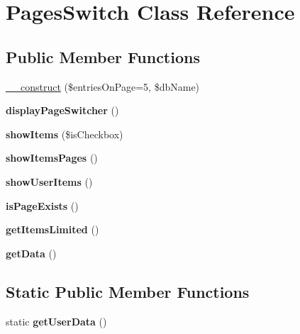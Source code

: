 \hypertarget{class_pages_switch}{}\section{Pages\+Switch Class Reference}
\label{class_pages_switch}
\subsection*{Public Member Functions}
\begin{DoxyCompactItemize}
\item 
\hyperlink{class_pages_switch_aa348d2193f6b5797af684dc8ae0e5c05}{\+\_\+\+\_\+construct} (\$entries\+On\+Page=5, \$db\+Name)
\item 
\hypertarget{class_pages_switch_ad9b788f51dc4e6326b5c82e78bed9265}{}{\bfseries display\+Page\+Switcher} ()\label{class_pages_switch_ad9b788f51dc4e6326b5c82e78bed9265}

\item 
\hypertarget{class_pages_switch_ad16bbacd730a2d8f2377120cbb9986db}{}{\bfseries show\+Items} (\$is\+Checkbox)\label{class_pages_switch_ad16bbacd730a2d8f2377120cbb9986db}

\item 
\hypertarget{class_pages_switch_a6f229ff2fb612ac2b541b97b532428d1}{}{\bfseries show\+Items\+Pages} ()\label{class_pages_switch_a6f229ff2fb612ac2b541b97b532428d1}

\item 
\hypertarget{class_pages_switch_a8bdd8e3ac71b22d622a8ec64b03f8a27}{}{\bfseries show\+User\+Items} ()\label{class_pages_switch_a8bdd8e3ac71b22d622a8ec64b03f8a27}

\item 
\hypertarget{class_pages_switch_a71543357048eeb0718d5155753d22319}{}{\bfseries is\+Page\+Exists} ()\label{class_pages_switch_a71543357048eeb0718d5155753d22319}

\item 
\hypertarget{class_pages_switch_ac9d0c3eaeec05b4367e4ec7ae3c9dc7e}{}{\bfseries get\+Items\+Limited} ()\label{class_pages_switch_ac9d0c3eaeec05b4367e4ec7ae3c9dc7e}

\item 
\hypertarget{class_pages_switch_a81a67162a6288d78fc4c55283325f0b4}{}{\bfseries get\+Data} ()\label{class_pages_switch_a81a67162a6288d78fc4c55283325f0b4}

\end{DoxyCompactItemize}
\subsection*{Static Public Member Functions}
\begin{DoxyCompactItemize}
\item 
\hypertarget{class_pages_switch_a6b8ba1fa8e7948a0a99e6cd86a18b5b4}{}static {\bfseries get\+User\+Data} ()\label{class_pages_switch_a6b8ba1fa8e7948a0a99e6cd86a18b5b4}

\end{DoxyCompactItemize}
